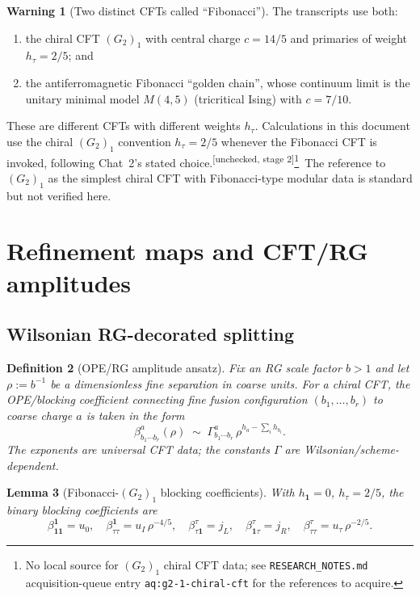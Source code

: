 \documentclass[11pt,a4paper]{article}
\newtheorem{definition}{Definition}[section]
\newtheorem{lemma}[definition]{Lemma}
\theoremstyle{definition}
\newtheorem{warning}[definition]{Warning}
\newcommand{\one}{\mathbf{1}}
\newcommand{\unchecked}{\textsuperscript{\textcolor{red!70!black}{[unchecked, stage 2]}}}
\begin{document}
\begin{warning}[Two distinct CFTs called ``Fibonacci'']\label{warn:fibCFTs}
The transcripts use both:
\begin{enumerate}[label=(\alph*)]
\item the chiral CFT $(G_2)_1$ with central charge $c=14/5$ and primaries
of weight $h_\tau = 2/5$; and
\item the antiferromagnetic Fibonacci ``golden chain'', whose continuum
limit is the unitary minimal model $M(4,5)$ (tricritical Ising) with
$c=7/10$.
\end{enumerate}
These are different CFTs with different weights $h_\tau$. Calculations in
this document use the chiral $(G_2)_1$ convention $h_\tau=2/5$ whenever the
Fibonacci CFT is invoked, following Chat~2's stated choice.\unchecked\footnote{No local source for $(G_2)_1$ chiral CFT data; see \texttt{RESEARCH\_NOTES.md} acquisition-queue entry \texttt{aq:g2-1-chiral-cft} for the references to acquire.}\
The reference to $(G_2)_1$ as the simplest chiral CFT with Fibonacci-type
modular data is standard but not verified here.
\end{warning}

\section{Refinement maps and CFT/RG amplitudes}

\subsection{Wilsonian RG-decorated splitting}

\begin{definition}[OPE/RG amplitude ansatz]\label{def:RG-amp}
Fix an RG scale factor $b>1$ and let $\rho := b^{-1}$ be a dimensionless
fine separation in coarse units. For a chiral CFT, the OPE/blocking
coefficient connecting fine fusion configuration $(b_1,\dots,b_r)$ to coarse
charge $a$ is taken in the form
\[
\beta^{a}_{b_1\cdots b_r}(\rho) \;\sim\; \Gamma^{a}_{b_1\cdots b_r}\,
\rho^{h_a - \sum_i h_{b_i}}.
\]
The exponents are universal CFT data; the constants $\Gamma$ are
Wilsonian/scheme-dependent.
\end{definition}

\begin{lemma}[Fibonacci-$(G_2)_1$ blocking coefficients]\label{lem:fib-beta}
With $h_\one=0$, $h_\tau=2/5$, the binary blocking coefficients are
\[
\beta^{\one}_{\one\one} = u_0,\quad
\beta^{\one}_{\tau\tau} = u_I\,\rho^{-4/5}, \quad
\beta^{\tau}_{\tau\one} = j_L,\quad
\beta^{\tau}_{\one\tau} = j_R,\quad
\beta^{\tau}_{\tau\tau} = u_\tau\,\rho^{-2/5}.
\]
\end{lemma}
\end{document}
